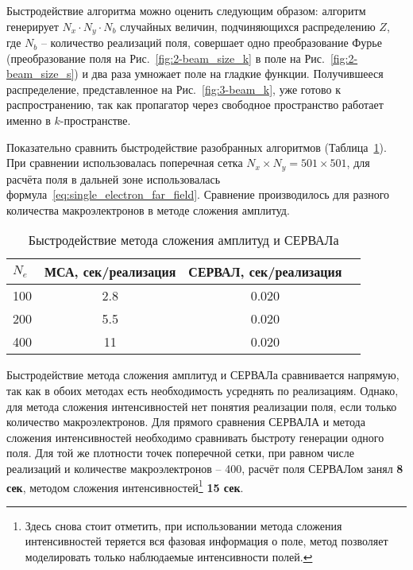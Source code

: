 Быстродействие алгоритма можно оценить следующим образом: алгоритм генерирует $N_x \cdot N_y \cdot N_b$ случайных величин, подчиняющихся распределению $Z$, где $N_b$ -- количество реализаций поля, совершает одно преобразование Фурье (преобразование поля на Рис.~\ref{fig:2-beam_size_k} в поле на Рис.~\ref{fig:2-beam_size_s}) и два раза умножает поле на гладкие функции. Получившееся распределение, представленное на Рис.~\ref{fig:3-beam_k}, уже готово к распространению, так как пропагатор через свободное пространство работает именно в $k$-пространстве. 

Показательно сравнить быстродействие разобранных алгоритмов (Таблица~\ref{tab:speed}). При сравнении использовалась поперечная сетка $N_x \times N_y = 501 \times 501$, для расчёта поля в дальней зоне использовалась формула~\ref{eq:single_electron_far_field}. Сравнение производилось для разного количества макроэлектронов в методе сложения амплитуд.
\begin{table}[H]
	\caption{Быстродействие метода сложения амплитуд и СЕРВАЛа}
	\label{tab:speed}	
	\begin{tabular}{l|c|c|c}
	$N_e$ & МСА, сек/реализация &СЕРВАЛ, сек/реализация \\ 
	\hline
	100   & 2.8 & 0.020\\
	\hline 
	200   & 5.5 & 0.020 \\
	\hline 
	400   & 11  & 0.020 \\
	\end{tabular}
\end{table} 
\noindent Быстродействие метода сложения амплитуд и СЕРВАЛа сравнивается напрямую, так как в обоих методах есть необходимость усреднять по реализациям. Однако, для метода сложения интенсивностей нет понятия реализации поля, если только количество макроэлектронов. Для прямого сравнения СЕРВАЛА и метода сложения интенсивностей необходимо сравнивать быстроту генерации одного поля. Для той же плотности точек поперечной сетки, при равном числе реализаций и количестве макроэлектронов -- 400, расчёт поля СЕРВАЛом занял \textbf{8 сек}, методом сложения интенсивностей\footnote{Здесь снова стоит отметить, при использовании метода сложения интенсивностей теряется вся фазовая информация о поле, метод позволяет моделировать только наблюдаемые интенсивности полей.} \textbf{15 сек}. 

